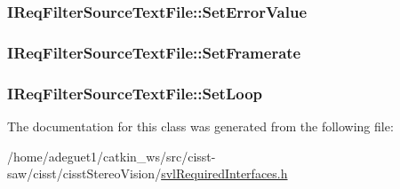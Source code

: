 \hypertarget{class_i_req_filter_source_text_file_a1bf825ca96ecaba04057138e9ff34a9e}{
\subsubsection[{Set\-Error\-Value}]{ I\-Req\-Filter\-Source\-Text\-File\-::\-Set\-Error\-Value}}\label{class_i_req_filter_source_text_file_a1bf825ca96ecaba04057138e9ff34a9e}
\hypertarget{class_i_req_filter_source_text_file_ab2f583e13bb4f0e6019fd749a43efbc7}{
\subsubsection[{Set\-Framerate}]{ I\-Req\-Filter\-Source\-Text\-File\-::\-Set\-Framerate}}\label{class_i_req_filter_source_text_file_ab2f583e13bb4f0e6019fd749a43efbc7}
\hypertarget{class_i_req_filter_source_text_file_a2790141d7cbbd3ff46682e50a558ad6e}{
\subsubsection[{Set\-Loop}]{ I\-Req\-Filter\-Source\-Text\-File\-::\-Set\-Loop}}\label{class_i_req_filter_source_text_file_a2790141d7cbbd3ff46682e50a558ad6e}


The documentation for this class was generated from the following file\-:\begin{DoxyCompactItemize}
\item 
/home/adeguet1/catkin\-\_\-ws/src/cisst-\/saw/cisst/cisst\-Stereo\-Vision/\hyperlink{svl_required_interfaces_8h}{svl\-Required\-Interfaces.\-h}\end{DoxyCompactItemize}
